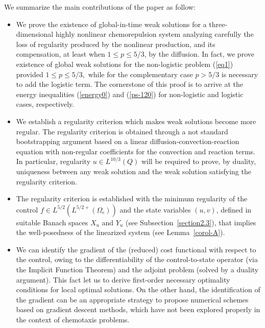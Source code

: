\documentclass[11pt,reqno]{amsart}%
\numberwithin{equation}{section}
\begin{document}
 
 We summarize the main contributions of the paper as follow: 
 \begin{itemize}
 \item We prove the existence of global-in-time weak solutions for a three-dimensional highly nonlinear chemorepulsion system analyzing carefully the loss of regularity produced by the
nonlinear production, and its compensation, at least when $1\leq  p \leq 5/3$, by the diffusion.  In fact, we  prove existence
of global weak solutions for the non-logistic problem (\ref{eq1}) provided $1\leq  p \leq 5/3,$ while for the
complementary case $p > 5/3$  is necessary to add the logistic term. The cornerstone of this proof is to arrive at the  energy inequalities (\ref{energy0}) and (\ref{ps-120}) for non-logistic and logistic cases, respectively.
 \item We establish a regularity criterion which makes weak solutions become more regular. The regularity criterion is obtained through a not standard bootstrapping argument based on a linear diffusion-convection-reaction equation with non-regular coefficients for the convection and reaction terms. In particular, regularity $u\in L^{10/3}(Q)$ will be required to prove, by duality,  uniqueness  between any weak solution and the weak solution satisfying the regularity  criterion.
\item The regularity criterion is established with the minimum regularity of the control $f\in L^{5/2}(L^{5/2+}(\Omega_c))$ and the state variables $(u,v)$, defined in suitable Banach spaces $X_u$ and $Y_u$  (see Subsection~\ref{section2.3}), 
 that implies the well-posedness of the linearized system (see Lemma~\ref{corol-A}).
 \item We  can identify the gradient of the (reduced) cost functional with respect to the control, owing to the
differentiability of the control-to-state operator (via the Implicit Function Theorem) and the adjoint problem (solved by a duality argument). This fact let us to derive first-order necessary optimality conditions for local optimal solutions. On the other hand,  the identification of the gradient can be an appropriate strategy to propose numerical schemes based on gradient descent methods, which have not been  explored properly in the context of chemotaxis problems.
 \end{itemize}
\end{document}
